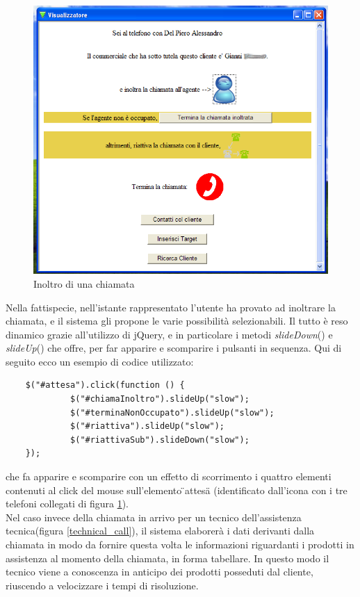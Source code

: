 \begin{figure}[!ht]
\centering
  \includegraphics[scale=0.75]{./images/inoltroScreen.png}
\caption{Inoltro di una chiamata}
\label{forward_call}
\end{figure}

\noindent
Nella fattispecie, nell'istante rappresentato l'utente ha provato ad inoltrare la chiamata, e il sistema gli propone le varie possibilit\`a selezionabili. Il tutto \`e reso dinamico grazie all'utilizzo di jQuery, e in particolare i metodi \textit{slideDown}() e \textit{slideUp}() che offre, per far apparire e scomparire i pulsanti in sequenza. Qui di seguito ecco un esempio di codice utilizzato:


\begin{verbatim}
    $("#attesa").click(function () {
             $("#chiamaInoltro").slideUp("slow");
             $("#terminaNonOccupato").slideUp("slow");
             $("#riattiva").slideUp("slow");
             $("#riattivaSub").slideDown("slow");
    });
\end{verbatim}               

\noindent
che fa apparire e scomparire con un effetto di scorrimento i quattro elementi contenuti al click del mouse sull'elemento \"{}attesa\"{} (identificato dall'icona con i tre telefoni collegati di figura \ref{forward_call}). \\
\noindent
Nel caso invece della chiamata in arrivo per un tecnico dell'assistenza tecnica(figura \ref{technical_call}), il sistema elaborer\`a i dati derivanti dalla chiamata in modo da fornire questa volta le informazioni riguardanti i prodotti in assistenza al momento della chiamata, in forma tabellare. In questo modo il tecnico viene a conoscenza in anticipo dei prodotti posseduti dal cliente, riuscendo a velocizzare i tempi di risoluzione.

